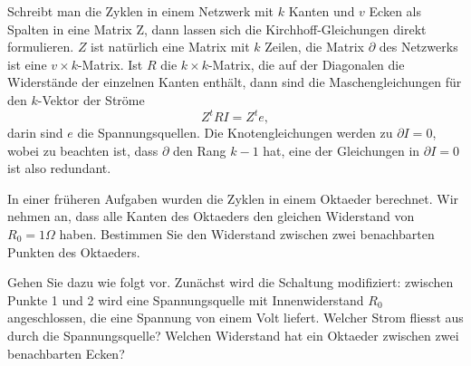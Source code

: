 Schreibt man die Zyklen in einem Netzwerk mit $k$ Kanten und $v$ Ecken
als Spalten in eine Matrix Z,
dann lassen sich die Kirchhoff-Gleichungen direkt formulieren.
$Z$ ist natürlich eine Matrix mit $k$ Zeilen, die Matrix $\partial$
des Netzwerks ist eine $v\times k$-Matrix.
Ist $R$ die $k\times k$-Matrix, die auf der Diagonalen die Widerstände der
einzelnen Kanten enthält, dann sind die Maschengleichungen für den
$k$-Vektor der Ströme 
\[
Z^tRI=Z^te,
\]
darin sind $e$ die Spannungsquellen.
Die Knotengleichungen werden zu $\partial I=0$, wobei zu beachten ist,
dass $\partial$ den Rang $k-1$ hat, eine der Gleichungen in $\partial I=0$ 
ist also redundant.

In einer früheren Aufgaben wurden die Zyklen in einem Oktaeder berechnet.
Wir nehmen an, dass alle Kanten des Oktaeders den gleichen Widerstand von
$R_0=1\Omega$ haben. Bestimmen Sie den Widerstand zwischen zwei benachbarten
Punkten des Oktaeders.


\begin{hinweis}
Gehen Sie dazu wie folgt vor.
Zunächst wird die Schaltung modifiziert: zwischen Punkte 1 und 2 wird eine
Spannungsquelle mit Innenwiderstand $R_0$ angeschlossen,
die eine Spannung von einem Volt liefert.
Welcher Strom fliesst aus durch die Spannungsquelle? Welchen Widerstand
hat ein Oktaeder zwischen zwei benachbarten Ecken?
\end{hinweis}

